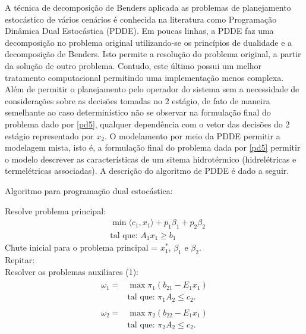A t\'ecnica de decomposi\c c\~ao de Benders aplicada as problemas de planejamento estoc\'astico de v\'arios cen\'arios
\'e conhecida na literatura como Programa\c c\~ao Din\^amica Dual Estoc\'astica (PDDE).
Em poucas linhas, a PDDE faz uma decomposi\c c\~ao no problema original utilizando-se os princ\'ipios de dualidade e a decomposi\c c\~ao
de Benders. Isto permite a resolu\c c\~ao do problema original, a partir da solu\c c\~ao de outro
problema. Contudo, este
\'ultimo possui um melhor tratamento computacional permitindo uma implementa\c c\~ao menos complexa. Al\'em de permitir
o planejamento pelo operador do sistema sem a necessidade de considera\c c\~oes sobre as decis\~oes tomadas no 2
est\'agio, de fato de maneira semelhante ao caso determin\'istico n\~ao se observar na formula\c c\~ao final do problema
dado por \ref{pd5}, qualquer depend\^encia com o vetor das decis\~oes do 2 est\'agio representado por $x_2$. O
modelamento por meio da PDDE permitir a modelagem mista, isto \'e, a formula\c c\~ao final do problema dada por
\ref{pd5} permitir o modelo descrever as caracter\'isticas de um sitema hidrot\'ermico (hidrel\'etricas e
termel\'etricas associadas). A descri\c c\~ao do algoritmo de PDDE \'e dado a seguir.
\begin{center}
Algoritmo para programa\c c\~ao dual estoc\'astica:\\
\end{center}
Resolve problema principal:
\begin{align*}
&\min \langle c_1,x_1\rangle + p_1\beta_1  + p_2\beta_2\nonumber\\
&\mbox{tal que: }	A_1 x_1 \geq b_1
\end{align*}
Chute inicial para o problema principal = $x_1^{*}$, $\beta_1$ e $\beta_2$.\\
Repitar:\\
Resolver  os problemas auxiliares (1):
\begin{align}
  \begin{split}	
	  \omega_1 = &\max \pi_1 (b_{21} - E_1x_1 ) \\
	&\mbox{tal que: }\pi_1 A_2  \leq c_2.
  \end{split}
 	\label{auxdual1}
\end{align}
\begin{align}
  \begin{split}	
	  \omega_2 = &\max \pi_2 (b_{22} - E_1x_1 ) \\
	&\mbox{tal que: }\pi_2 A_2  \leq c_2.
  \end{split}
 	\label{auxdual2}
\end{align}

